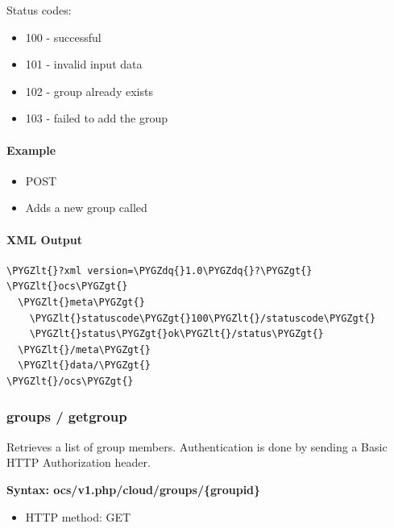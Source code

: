 \documentclass[letterpaper,10pt,english]{sphinxmanual}
\def\PYGZlt{\char`\<}
\def\PYGZgt{\char`\>}
\def\PYGZdq{\char`\"}
\begin{document}
Status codes:
\begin{itemize}
\item {} 
100 - successful

\item {} 
101 - invalid input data

\item {} 
102 - group already exists

\item {} 
103 - failed to add the group

\end{itemize}


\paragraph{Example}
\label{configuration_user/user_provisioning_api:id22}\begin{itemize}
\item {} 
POST 

\item {} 
Adds a new group called 

\end{itemize}


\paragraph{XML Output}
\label{configuration_user/user_provisioning_api:id23}
\begin{Verbatim}[commandchars=\\\{\}]
\PYGZlt{}?xml version=\PYGZdq{}1.0\PYGZdq{}?\PYGZgt{}
\PYGZlt{}ocs\PYGZgt{}
  \PYGZlt{}meta\PYGZgt{}
    \PYGZlt{}statuscode\PYGZgt{}100\PYGZlt{}/statuscode\PYGZgt{}
    \PYGZlt{}status\PYGZgt{}ok\PYGZlt{}/status\PYGZgt{}
  \PYGZlt{}/meta\PYGZgt{}
  \PYGZlt{}data/\PYGZgt{}
\PYGZlt{}/ocs\PYGZgt{}
\end{Verbatim}


\subsubsection{\textbf{groups / getgroup}}
\label{configuration_user/user_provisioning_api:groups-getgroup}
Retrieves a list of group members. Authentication is done by sending a Basic
HTTP Authorization header.

\textbf{Syntax: ocs/v1.php/cloud/groups/\{groupid\}}
\begin{itemize}
\item {} 
HTTP method: GET

\end{itemize}
\end{document}
